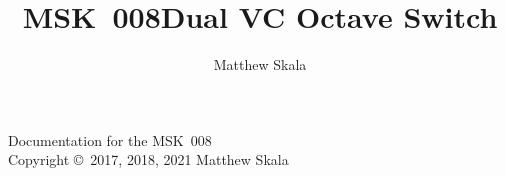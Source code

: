 \documentclass{ncmanual}
\title{MSK~008\quad Dual VC Octave Switch}
\author{Matthew Skala}
\begin{document}
\maketitle


\begin{copyrightpage}
Documentation for the MSK~008\\
Copyright \copyright\ 2017, 2018, 2021 Matthew Skala

\GPLThreeStatement
\end{copyrightpage}

\tableofcontents












\end{document}
